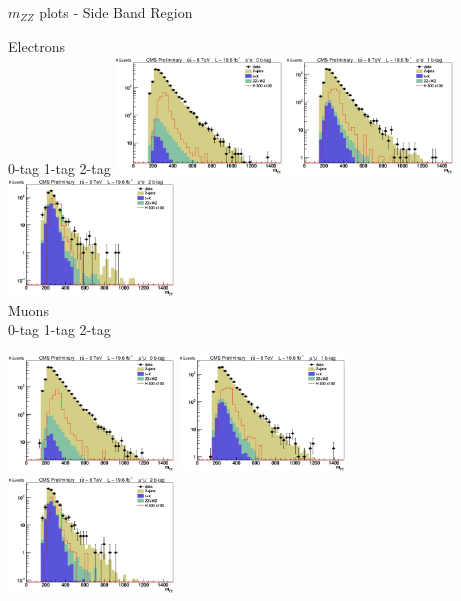 \begin{frame}{$m_{ZZ}$ plots - Side Band Region}
  \begin{center}
    Electrons\\
    0-tag \hspace{7.5em} 1-tag \hspace{7.5em} 2-tag
  \includegraphics[width=0.33\textwidth]{images/preselection/0/el/mZZ_sideband_log.eps}
  \includegraphics[width=0.33\textwidth]{images/preselection/1/el/mZZ_sideband_log.eps}
  \includegraphics[width=0.33\textwidth]{images/preselection/2/el/mZZ_sideband_log.eps}\\
  Muons\\
    0-tag \hspace{7.5em} 1-tag \hspace{7.5em} 2-tag
  
  \includegraphics[width=0.33\textwidth]{images/preselection/0/mu/mZZ_sideband_log.eps}
  \includegraphics[width=0.33\textwidth]{images/preselection/1/mu/mZZ_sideband_log.eps}
  \includegraphics[width=0.33\textwidth]{images/preselection/2/mu/mZZ_sideband_log.eps}
  \end{center}
\end{frame}


